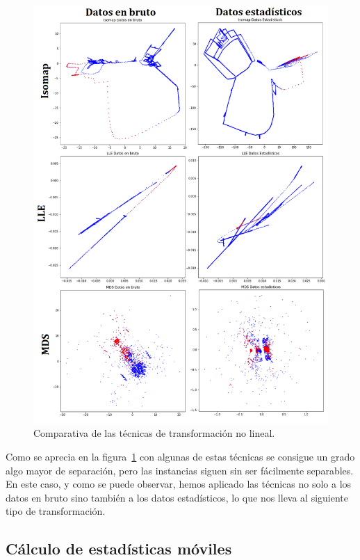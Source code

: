 \begin{figure}
	\centering
	\includegraphics[width=1\textwidth]{../img/manifolds.png}
	\caption{Comparativa de las técnicas de transformación no lineal.}
	\label{fig:manifolds}
\end{figure}

Como se aprecia en la figura~\ref{fig:manifolds} con algunas de estas técnicas se consigue un grado algo mayor de separación, pero las instancias siguen sin ser fácilmente separables. En este caso, y como se puede observar, hemos aplicado las técnicas no solo a los datos en bruto sino también a los datos estadísticos, lo que nos lleva al siguiente tipo de transformación. 

\subsection{Cálculo de estadísticas móviles}

